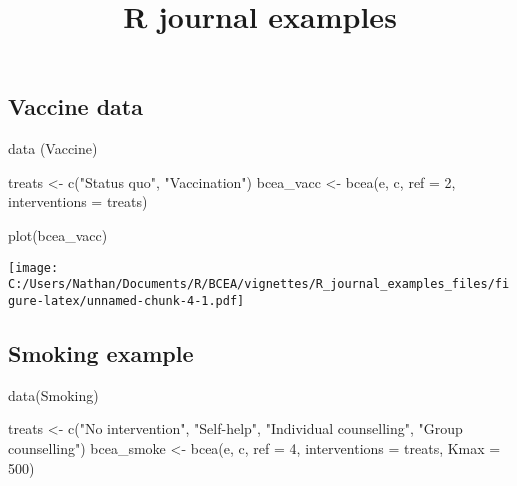 \documentclass[
]{article}
\title{R journal examples}
\author{}
\date{\vspace{-2.5em}}
\newenvironment{Shaded}{\begin{snugshade}}{\end{snugshade}}
\newcommand{\AttributeTok}[1]{\textcolor[rgb]{0.77,0.63,0.00}{#1}}
\newcommand{\DecValTok}[1]{\textcolor[rgb]{0.00,0.00,0.81}{#1}}
\newcommand{\FunctionTok}[1]{\textcolor[rgb]{0.00,0.00,0.00}{#1}}
\newcommand{\NormalTok}[1]{#1}
\newcommand{\OtherTok}[1]{\textcolor[rgb]{0.56,0.35,0.01}{#1}}
\newcommand{\StringTok}[1]{\textcolor[rgb]{0.31,0.60,0.02}{#1}}
\begin{document}
\maketitle

\hypertarget{vaccine-data}{%
\subsection{Vaccine data}\label{vaccine-data}}

\begin{Shaded}
\begin{Highlighting}[]
\FunctionTok{data}\NormalTok{ (Vaccine)}

\NormalTok{treats }\OtherTok{\textless{}{-}} \FunctionTok{c}\NormalTok{(}\StringTok{"Status quo"}\NormalTok{, }\StringTok{"Vaccination"}\NormalTok{)}
\NormalTok{bcea\_vacc }\OtherTok{\textless{}{-}} \FunctionTok{bcea}\NormalTok{(e, c, }\AttributeTok{ref =} \DecValTok{2}\NormalTok{, }\AttributeTok{interventions =}\NormalTok{ treats)}
\end{Highlighting}
\end{Shaded}

\begin{Shaded}
\begin{Highlighting}[]
\FunctionTok{plot}\NormalTok{(bcea\_vacc)}
\end{Highlighting}
\end{Shaded}

\texttt{[image: C:/Users/Nathan/Documents/R/BCEA/vignettes/R\_journal\_examples\_files/figure-latex/unnamed-chunk-4-1.pdf]}

\hypertarget{smoking-example}{%
\subsection{Smoking example}\label{smoking-example}}

\begin{Shaded}
\begin{Highlighting}[]
\FunctionTok{data}\NormalTok{(Smoking)}

\NormalTok{treats }\OtherTok{\textless{}{-}} \FunctionTok{c}\NormalTok{(}\StringTok{"No intervention"}\NormalTok{, }\StringTok{"Self{-}help"}\NormalTok{, }\StringTok{"Individual counselling"}\NormalTok{, }\StringTok{"Group counselling"}\NormalTok{)}
\NormalTok{bcea\_smoke }\OtherTok{\textless{}{-}} \FunctionTok{bcea}\NormalTok{(e, c, }\AttributeTok{ref =} \DecValTok{4}\NormalTok{, }\AttributeTok{interventions =}\NormalTok{ treats, }\AttributeTok{Kmax =} \DecValTok{500}\NormalTok{)}
\end{Highlighting}
\end{Shaded}
\end{document}
